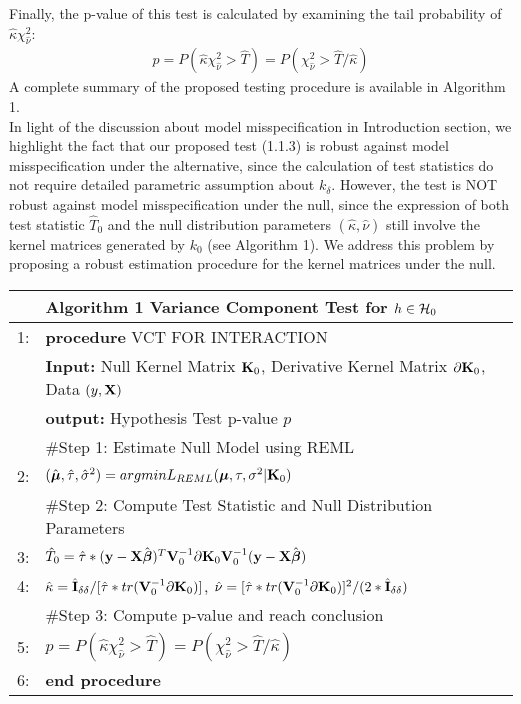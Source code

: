 \documentclass[11pt]{article}
\begin{document}
Finally, the p-value of this test is calculated by examining the tail probability of $\hat{\kappa} \chi_{\hat{\nu}}^2$:
\begin{align*}
p=P(\hat{\kappa} \chi_{\hat{\nu}}^2>\hat{T})=P(\chi_{\hat{\nu}}^2>\hat{T}/\hat{\kappa})
\end{align*}
A complete summary of the proposed testing procedure is available in Algorithm 1.\\
In light of the discussion about model misspecification in Introduction section, we highlight the fact that our proposed test (1.1.3) is robust against model misspecification under the alternative, since the calculation of test statistics do not require detailed parametric assumption about $k_\delta$. However, the test is NOT robust against model misspecification under the null, since the expression of both test statistic $\hat{T}_0$ and the null distribution parameters $(\hat{\kappa}, \hat{\nu})$ still involve the kernel matrices generated by $k_0$ (see Algorithm 1). We address this problem by proposing a robust estimation procedure for the kernel matrices under the null.
\begin{table}[]
\centering
\begin{tabular}{lll}
\hline
&\textbf{Algorithm 1} Variance Component Test for $h \in {\cal H}_0$ \\ \hline
1: &\textbf{procedure} VCT FOR INTERACTION\\
&\textbf{Input:} Null Kernel Matrix ${\bf K}_0$, Derivative Kernel Matrix $\partial {\bf K}_0$, Data $(y, {\bf X})$\\
&\textbf{output:} Hypothesis Test p-value $p$\\
&\#Step 1: \quad Estimate Null Model using REML\\
2: \quad &$(\hat{\boldsymbol{\mu}}, \hat{\tau}, \hat{\sigma}^2)=argmin L_{REML}(\boldsymbol{\mu}, \tau, \sigma^2|{\bf K}_0)$\\
&\#Step 2: \quad Compute Test Statistic and Null Distribution Parameters\\
3: \quad &$\hat{T}_0=\hat{\tau}*({\bf y}-{\bf X}\hat{\boldsymbol{\beta}})^T{\bf V}_0^{-1}\partial {\bf K}_0{\bf V}_0^{-1}({\bf y}-{\bf X}\hat{\boldsymbol{\beta}})$\\
4: \quad &$\hat{\kappa}=\hat{{\bf I}}_{\delta\delta}/[\hat{\tau}*tr({\bf V}_0^{-1}\partial {\bf K}_0)]$, \quad $\hat{\nu}=[\hat{\tau}*tr({\bf V}_0^{-1}\partial {\bf K}_0)]^2/(2*\hat{{\bf I}}_{\delta\delta})$\\
&\#Step 3: \quad Compute p-value and reach conclusion\\
5: \quad &$p=P(\hat{\kappa} \chi_{\hat{\nu}}^2>\hat{T})=P(\chi_{\hat{\nu}}^2>\hat{T}/\hat{\kappa})$\\
6: &\textbf{end procedure}\\
\hline
\end{tabular}
\end{table}
\end{document}

